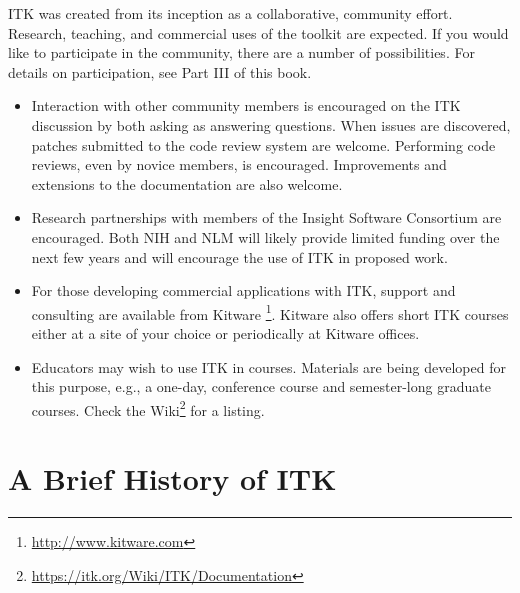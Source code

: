 ITK was created from its inception as a collaborative, community
effort. Research, teaching, and commercial uses of the toolkit are
expected. If you would like to participate in the community, there are a
number of possibilities. For details on participation, see Part III of this book.

\begin{itemize}
       \item Interaction with other community members is encouraged on the ITK
       discussion by both asking as answering questions. When issues are
       discovered, patches submitted to the code review system are welcome.
       Performing code reviews, even by novice members, is encouraged.
       Improvements and extensions to the documentation are also welcome.

       \item Research partnerships with members of the Insight Software
       Consortium are encouraged. Both NIH and NLM will likely provide
       limited funding over the next few years and will encourage the use of
       ITK in proposed work.

       \item For those developing commercial applications with ITK, support
       and consulting are available from Kitware \footnote{\url{http://www.kitware.com}}.
       Kitware also offers short ITK courses either at a site of your choice
       or periodically at Kitware offices.

       \item Educators may wish to use ITK in courses. Materials are being
       developed for this purpose, e.g., a one-day, conference course and
       semester-long graduate courses. Check the
       Wiki\footnote{\url{https://itk.org/Wiki/ITK/Documentation}} for a listing.
\end{itemize}

\section{A Brief History of ITK}
\label{sec:History}

